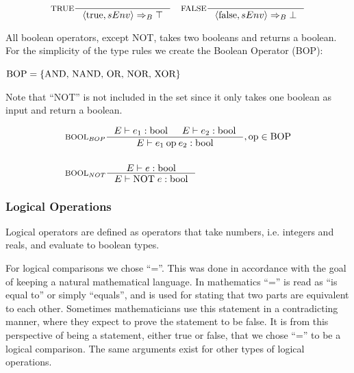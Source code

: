 \begin{align*}
&\inference[TRUE]{}
                   {\Braket{\Ttrue,sEnv} \Rightarrow_B \top}
&\inference[FALSE]{}
                   {\Braket{\Tfalse,sEnv} \Rightarrow_B \bot}
\end{align*}


All boolean operators, except NOT, takes two booleans and returns a boolean. For the simplicity of the type rules we create the Boolean Operator (BOP):

\begin{center}
$\text{BOP} = \left\{ {\text{AND, NAND, OR, NOR, XOR}} \right\}$
\end{center}

Note that \enquote{NOT} is not included in the set since it only takes one boolean as input and return a boolean.

\begin{align*}
&\inference[$\text{BOOL}_{BOP}$]{\Tenv e_1 : \Tbool &
                       \Tenv e_2 : \Tbool}
                    {\Tenv e_1 \mathbin{\text{op}} e_2 : \Tbool}, \text{op} \in \Tbop
\\\\
&\inference[$\text{BOOL}_{NOT}$]{\Tenv e : \Tbool}
                    {\Tenv \mathbin{\text{NOT}} \; e : \Tbool}
\end{align*}


\subsubsection{Logical Operations}
\label{sec:logicOps}

Logical operators are defined as operators that take numbers, i.e. integers and reals, and evaluate to boolean types.

For logical comparisons we chose \enquote{=}. This was done in accordance with the goal of keeping a natural mathematical language. In mathematics \enquote{=} is read as \enquote{is equal to} or simply \enquote{equals}, and is used for stating that two parts are equivalent to each other. Sometimes mathematicians use this statement in a contradicting manner, where they expect to prove the statement to be false. It is from this perspective of being a statement, either true or false, that we chose \enquote{=} to be a logical comparison. The same arguments exist for other types of logical operations.

